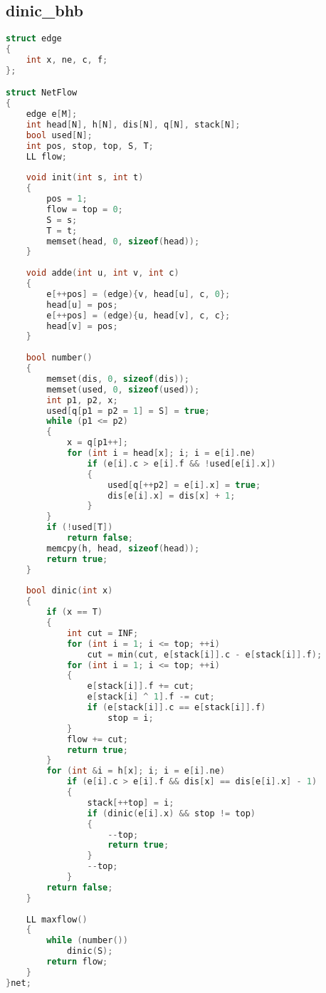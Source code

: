 \subsection{dinic\_bhb}
\begin{lstlisting}[language=C++]
struct edge
{
	int x, ne, c, f;
};

struct NetFlow
{
	edge e[M];
	int head[N], h[N], dis[N], q[N], stack[N];
	bool used[N];
	int pos, stop, top, S, T;
	LL flow;
	
	void init(int s, int t)
	{
		pos = 1;
		flow = top = 0;
		S = s;
		T = t;
		memset(head, 0, sizeof(head));
	}
	
	void adde(int u, int v, int c)
	{
		e[++pos] = (edge){v, head[u], c, 0};
		head[u] = pos;
		e[++pos] = (edge){u, head[v], c, c};
		head[v] = pos;
	}
	
	bool number()
	{
		memset(dis, 0, sizeof(dis));
		memset(used, 0, sizeof(used));
		int p1, p2, x;
		used[q[p1 = p2 = 1] = S] = true;
		while (p1 <= p2)
		{
			x = q[p1++];
			for (int i = head[x]; i; i = e[i].ne)
				if (e[i].c > e[i].f && !used[e[i].x])
				{
					used[q[++p2] = e[i].x] = true;
					dis[e[i].x] = dis[x] + 1;
				}
		}
		if (!used[T])
			return false;
		memcpy(h, head, sizeof(head));
		return true;
	}
	
	bool dinic(int x)
	{
		if (x == T)
		{
			int cut = INF;
			for (int i = 1; i <= top; ++i)
				cut = min(cut, e[stack[i]].c - e[stack[i]].f);
			for (int i = 1; i <= top; ++i)
			{
				e[stack[i]].f += cut;
				e[stack[i] ^ 1].f -= cut;
				if (e[stack[i]].c == e[stack[i]].f)
					stop = i;
			}
			flow += cut;
			return true;
		}
		for (int &i = h[x]; i; i = e[i].ne)
			if (e[i].c > e[i].f && dis[x] == dis[e[i].x] - 1)
			{
				stack[++top] = i;
				if (dinic(e[i].x) && stop != top)
				{
					--top;
					return true;
				}
				--top;
			}
		return false;
	}
	
	LL maxflow()
	{
		while (number())
			dinic(S);
		return flow;
	}
}net;
\end{lstlisting}
